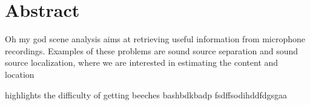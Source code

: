 \chapter*{Abstract}

Oh my god
scene analysis aims at retrieving useful information from microphone recordings.
Examples of these problems are sound source separation and sound source localization, where we are interested in estimating the content and location


 highlights the difficulty of getting beeches
bashbdkbadp
fsdffsodihddfdgsgaa